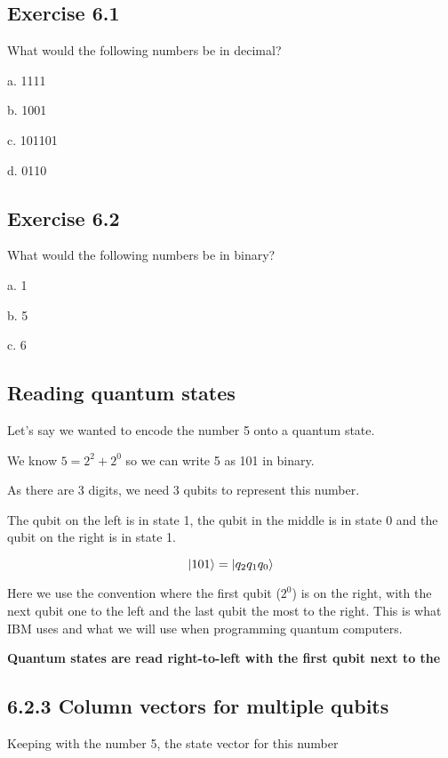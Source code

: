 \documentclass{book}
\begin{document}
\hline

\subsection{Exercise 6.1}

What would the following numbers be in decimal?

a. 1111

b. 1001

c. 101101

d. 0110

\subsection{Exercise 6.2}

What would the following numbers be in binary? 

a. 1 

b. 5

c. 6 \newline

\hline
\subsection{ Reading quantum states }

Let's say we wanted to encode the number 5 onto a quantum state. 

We know $ 5 = 2^2 + 2^0$ so we can write 5 as 101 in binary. 

As there are 3 digits, we need 3 qubits to represent this number. 

The qubit on the left is in state 1, the qubit in the middle is in state 0 and the qubit on the right is in state 1. 

$$ \ket{101} = \ket{q_2q_1q_0} $$

Here we use the convention where the first qubit ($2^0$) is on the right, with the next qubit one to the left and the last qubit the most to the right. This is what IBM uses and what we will use when programming quantum computers.

\textbf{Quantum states are read right-to-left with the first qubit next to the $\>$}

\subsection{6.2.3 Column vectors for multiple qubits}

Keeping with the number 5, the state vector for this number 
\end{document}
